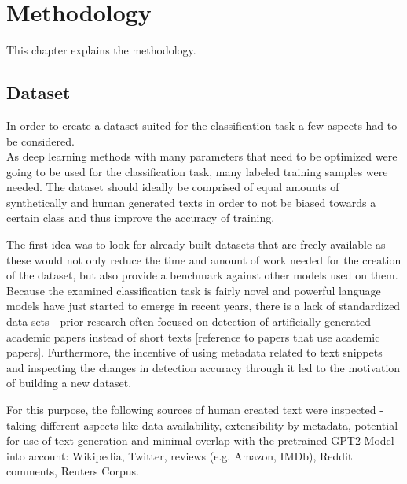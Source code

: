\section{Methodology}
\label{ch:methodology}

This chapter explains the methodology.

\subsection{Dataset}
\label{sec:dataset}

In order to create a dataset suited for the classification task a few aspects had to be considered. \\
As deep learning methods with many parameters that need to be optimized were going to be used for the classification task, many labeled training samples were needed. The dataset should ideally be comprised of equal amounts of synthetically and human generated texts in order to not be biased towards a certain class and thus improve the accuracy of training.

The first idea was to look for already built datasets that are freely available as these would not only reduce 
the time and amount of work needed for the creation of the dataset, but also provide a benchmark against other 
models used on them. Because the examined classification task is fairly novel and powerful language models have 
just started to emerge in recent years, there is a lack of standardized data sets - prior research 
often focused on detection of artificially generated academic papers instead of short texts 
[reference to papers that use academic papers]. Furthermore, the incentive of using metadata related to text 
snippets and inspecting the changes in detection accuracy through it led to the motivation of building a new dataset.

For this purpose, the following sources of human created text were inspected - taking different aspects like 
data availability, extensibility by metadata, potential for use of text generation and minimal overlap with the 
pretrained GPT2 Model into account: Wikipedia, Twitter, reviews (e.g. Amazon, IMDb), Reddit comments, Reuters Corpus.

